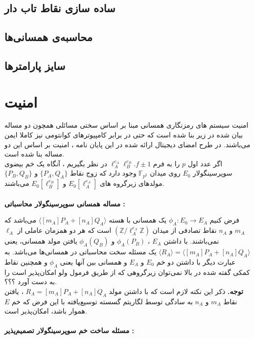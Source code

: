 \documentclass[12pt,a4paper]{article}
\begin{document}
\subsection{\bf ساده سازی نقاط تاب دار}\label{torsion_point}

\subsection{\bf محاسبه‌ی همسانی‌ها}\label{compute_isogeny}
 
\subsection{\bf سایز پارامترها}\label{size_parameter} 

\section{\bf امنیت}\label{security}

امنیت سیستم های رمزنگاری همسانی مبنا بر اساس سختی مسائلی همچون دو مساله  بیان شده در زیر بنا شده است که حتی در برابر کامپیوترهای کوانتومی نیز کاملا ایمن می‌باشند. در طرح امضای دیجیتال ارائه شده در این پایان نامه ، امنیت بر اساس این دو مساله بنا شده است.\\


اگر عدد اول 
$p$
را به فرم
$\ell_A^{e_A} \ell_B^{e_B} . f \pm 1 $
در نظر بگیریم ، آنگاه یک خم بیضوی سوپرسینگولار 
$E_0$
روی میدان
$\mathbb{F}_{p^2}$
وجود دارد که زوج نقاط
$\{P_A , Q_A \}$
و
$\{ P_B , Q_B \}$
مولدهای زیرگروه های
$E_0[\ell_A^{e_A}]$
و
$E_0[\ell_B^{e_B}]$
می‌باشند. 
\\
\\
\textbf{ مساله همسانی سوپرسینگولار محاسباتی :‌}

فرض کنیم 
$\phi_A :‌E_0 \rightarrow E_A $
یک همسانی  با هسته 
$\langle [m_A]P_A + [n_A]Q_A \rangle $
می‌باشد که
$m_A$
و
$n_A$
نقاط تصادفی از میدان
$ (\mathbb{Z} / \ell_A^{e_A} \mathbb{Z}) $
است که هر دو همزمان عاملی از 
$\ell_A$
نمی‌باشند.
با داشتن
$E_A$
،
$\phi_A(P_B)$
و
$\phi_A(Q_B)$
 یافتن مولد همسانی، یعنی
$\langle R_A \rangle  = \langle [m_A]P_A + [n_A]Q_A \rangle $
یک مسئله سخت محاسباتی در همسانی‌ها می‌باشد. به عبارت دیگر با داشتن دو خم 
$E_0$
و
$E_A$
و همسانی بین آنها یعنی
$\phi_{A}$
و همچنین نقاط کمکی گفته شده در بالا نمی‌توان زیرگروهی که از طریق فرمول ولو امکان‌پذیر است را به دست آورد ؟؟؟.
\\
\textbf{توجه.}
ذکر این نکته لازم است که با داشتن مولد
$R_A = [m_A]P_A + [n_A]Q_A$
، یافتن نقاط
$m_A$
و
$n_A$
به سادگی توسط لگاریتم گسسته توسیع‌یافته 
 با این فرض که خم 
$E$
هموار باشد، امکان‌پذیر است.
\cite{eDS}
\\
\\
\textbf{ مسئله ساخت خم سوپرسینگولار تصمیم‌پذیر : }
\end{document}
